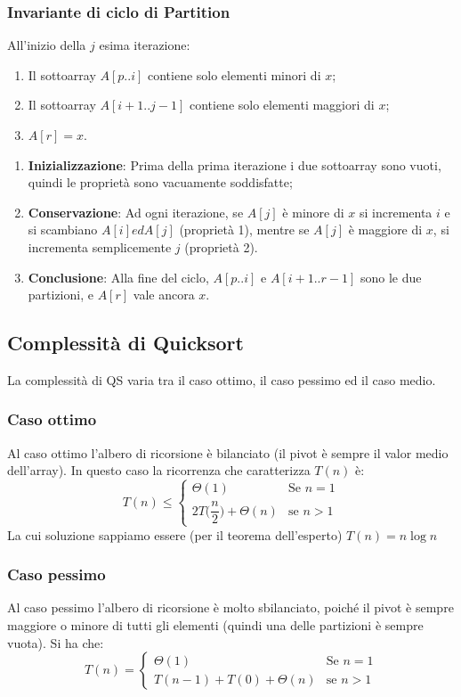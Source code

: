 \documentclass[a4paper,10pt]{article}
\theoremstyle{definition}
\begin{document}
\subsubsection{Invariante di ciclo di Partition}
All'inizio della $j$ esima iterazione:
\begin{enumerate}
 \item Il sottoarray $A[p .. i]$ contiene solo elementi minori di $x$;
 \item Il sottoarray $A[i+1 .. j-1]$ contiene solo elementi maggiori di $x$;
 \item $A[r] = x$.
\end{enumerate}
\begin{enumerate}
    \item \textbf{Inizializzazione}: Prima della prima iterazione i due sottoarray sono vuoti, quindi le proprietà sono vacuamente soddisfatte;
    \item \textbf{Conservazione}: Ad ogni iterazione, se $A[j]$ è minore di $x$ si incrementa $i$ e si scambiano $A[i] ed A[j]$ (proprietà 1), mentre se $A[j]$ è maggiore di $x$, si incrementa semplicemente $j$ (proprietà 2). 
    \item \textbf{Conclusione}: Alla fine del ciclo, $A[p .. i]$ e $A[i+1 .. r-1]$ sono le due partizioni, e $A[r]$ vale ancora $x$.
\end{enumerate}

\subsection{Complessità di Quicksort}
La complessità di QS varia tra il caso ottimo, il caso pessimo ed il caso medio.
\subsubsection{Caso ottimo}
Al caso ottimo l'albero di ricorsione è bilanciato (il pivot è sempre il valor medio dell'array). In questo caso la ricorrenza che caratterizza $T(n)$ è:
\[T(n) \leq \begin{cases}
            \Theta(1) &\text{Se $n = 1$}\\
            2T\bigg(\dfrac{n}{2}\bigg) + \Theta(n) &\text{se $n > 1$}
         \end{cases}
\]
La cui soluzione sappiamo essere (per il teorema dell'esperto) $T(n) = n \log n$
\subsubsection{Caso pessimo}
Al caso pessimo l'albero di ricorsione è molto sbilanciato, poiché il pivot è sempre maggiore o minore di tutti gli elementi (quindi una delle partizioni è sempre vuota). Si ha che:
\[T(n) = \begin{cases}
            \Theta(1) &\text{Se $n = 1$}\\
            T(n-1) + T(0) + \Theta(n) &\text{se $n > 1$}
         \end{cases}
\]
\end{document}
